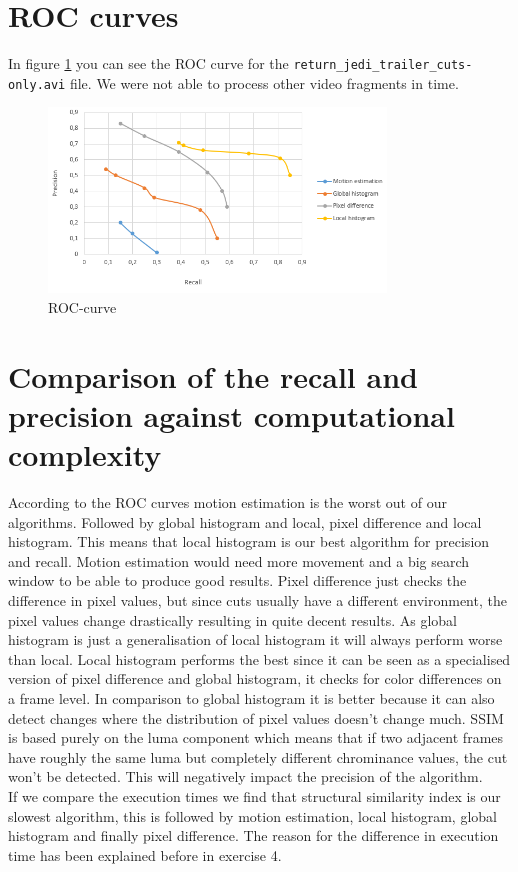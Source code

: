 \documentclass[a4paper,11pt,oneside]{article}
\begin{document}
\section{ROC curves}
In figure \ref{fig:ROC} you can see the ROC curve for the \verb!return_jedi_trailer_cuts-only.avi! file. We were not able to process other video fragments in time.
\begin{figure}[H]
\centering
\includegraphics[width=0.8\textwidth]{img/ROC_jedi.png}
\caption{ROC-curve}\label{fig:ROC}
\end{figure}

\section{Comparison of the recall and precision against computational complexity}
According to the ROC curves motion estimation is the worst out of our algorithms. Followed by global histogram and local, pixel difference and local histogram. This means that local histogram is our best algorithm for precision and recall. Motion estimation would need more movement and a big search window to be able to produce good results. Pixel difference just checks the difference in pixel values, but since cuts usually have a different environment, the pixel values change drastically resulting in quite decent results. As global histogram is just a generalisation of local histogram it will always perform worse than local. Local histogram performs the best since it can be seen as a specialised version of pixel difference and global histogram, it checks for color differences on a frame level. In comparison to global histogram it is better because it can also detect changes where the distribution of pixel values doesn't change much. SSIM is based purely on the luma component which means that if two adjacent frames have roughly the same luma but completely different chrominance values, the cut won't be detected. This will negatively impact the precision of the algorithm.\\
If we compare the execution times we find that structural similarity index is our slowest algorithm, this is followed by motion estimation, local histogram, global histogram and finally pixel difference. The reason for the difference in execution time has been explained before in exercise 4.
\end{document}
